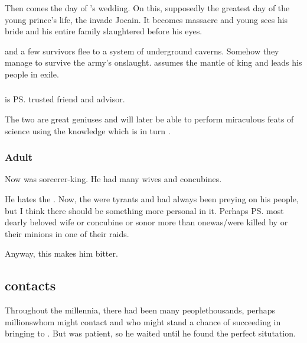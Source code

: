 Then comes the day of \Semiza{}'s wedding. 
On this, supposedly the greatest day of the young prince's life, the \dragons{} invade Jocain. 
It becomes massacre and young \Semiza{} sees his bride and his entire family slaughtered before his eyes. 

\Semiza{} and a few survivors flee to a system of underground caverns. 
Somehow they manage to survive the \draconic{} army's onslaught. 
\Semiza{} assumes the mantle of king and leads his people in exile. 





\subsubsection{\Eshayzal}
\Eshayzal{} is \ps{\Semiza}{} trusted friend and advisor. 

The two are great geniuses and will later be able to perform miraculous feats of science using the \dash knowledge which is in turn .





\subsubsection{Adult \Semiza}
Now \Semiza{} was sorcerer-king.
He had many wives and concubines. 

He hates the \dragons{}. 
Now, the \dragons{} were tyrants and had always been preying on his people, but I think there should be something more personal in it. 
Perhaps \ps{\Semiza}{} most dearly beloved wife or concubine or son\dash or more than one\dash was/were killed by \dragons{} or their minions in one of their raids. 

Anyway, this makes him bitter.









\subsection[{\Daggerrain contacts Semiza}]{\Daggerrain contacts \Semiza}
Throughout the millennia, there had been many people\dash thousands, perhaps millions\dash whom \Daggerrain{} might contact and who might stand a chance of succeeding in bringing \banes{} to \Miith. 
But \Daggerrain{} was patient, so he waited until he found the perfect situtation. 

